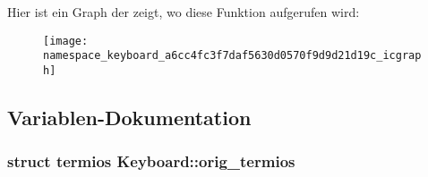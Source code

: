 Hier ist ein Graph der zeigt, wo diese Funktion aufgerufen wird:
\nopagebreak
\begin{figure}[H]
\begin{center}
\leavevmode
\texttt{[image: namespace\_keyboard\_a6cc4fc3f7daf5630d0570f9d9d21d19c\_icgraph]}
\end{center}
\end{figure}




\subsection{Variablen-\/Dokumentation}
\hypertarget{namespace_keyboard_a8b623d5192e406c97c4e265dbe4c5f38}{
\subsubsection[{orig\_\-termios}]{\setlength{\rightskip}{0pt plus 5cm}struct termios {\bf Keyboard::orig\_\-termios}}}
\label{namespace_keyboard_a8b623d5192e406c97c4e265dbe4c5f38}

